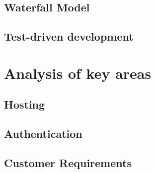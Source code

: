 \subsection{Waterfall Model}

\subsection{Test-driven development}

\section{Analysis of key areas}

\subsection{Hosting}

\subsection{Authentication}

\subsection{Customer Requirements}

